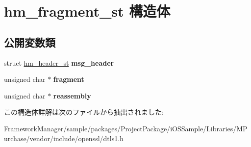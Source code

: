 \hypertarget{structhm__fragment__st}{}\section{hm\+\_\+fragment\+\_\+st 構造体}
\label{structhm__fragment__st}
\subsection*{公開変数類}
\begin{DoxyCompactItemize}
\item 
\hypertarget{structhm__fragment__st_a171c5cb6c7c15bdf7c6401d022247729}{}struct \hyperlink{structhm__header__st}{hm\+\_\+header\+\_\+st} {\bfseries msg\+\_\+header}\label{structhm__fragment__st_a171c5cb6c7c15bdf7c6401d022247729}

\item 
\hypertarget{structhm__fragment__st_ab36bd817673b28cc64b927b62faf7225}{}unsigned char $\ast$ {\bfseries fragment}\label{structhm__fragment__st_ab36bd817673b28cc64b927b62faf7225}

\item 
\hypertarget{structhm__fragment__st_a50a13bdc9997bc66cb7c578519413510}{}unsigned char $\ast$ {\bfseries reassembly}\label{structhm__fragment__st_a50a13bdc9997bc66cb7c578519413510}

\end{DoxyCompactItemize}


この構造体詳解は次のファイルから抽出されました\+:\begin{DoxyCompactItemize}
\item 
Framework\+Manager/sample/packages/\+Project\+Package/i\+O\+S\+Sample/\+Libraries/\+M\+Purchase/vendor/include/openssl/dtls1.\+h\end{DoxyCompactItemize}
